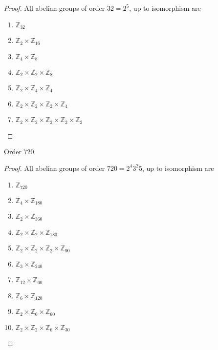 \begin{proof}
    All abelian groups of order $32 = 2^{5}$, up to isomorphism are
    \begin{enumerate}
        \item $\mathbb{Z}_{32}$
        \item $\mathbb{Z}_{2} \times \mathbb{Z}_{16}$
        \item $\mathbb{Z}_{4} \times \mathbb{Z}_{8}$
        \item $\mathbb{Z}_{2} \times \mathbb{Z}_{2} \times \mathbb{Z}_{8}$
        \item $\mathbb{Z}_{2} \times \mathbb{Z}_{4} \times \mathbb{Z}_{4}$
        \item $\mathbb{Z}_{2} \times \mathbb{Z}_{2} \times \mathbb{Z}_{2} \times \mathbb{Z}_{4}$
        \item $\mathbb{Z}_{2} \times \mathbb{Z}_{2} \times \mathbb{Z}_{2} \times \mathbb{Z}_{2} \times \mathbb{Z}_{2}$
    \end{enumerate}
\end{proof}

\begin{exercise}
    Order 720
\end{exercise}

\begin{proof}
    All abelian groups of order $720 = 2^{4}3^{2}5$, up to isomorphism are
    \begin{enumerate}
        \item $\mathbb{Z}_{720}$
        \item $\mathbb{Z}_{4} \times \mathbb{Z}_{180}$
        \item $\mathbb{Z}_{2} \times \mathbb{Z}_{360}$
        \item $\mathbb{Z}_{2} \times \mathbb{Z}_{2} \times \mathbb{Z}_{180}$
        \item $\mathbb{Z}_{2} \times \mathbb{Z}_{2} \times \mathbb{Z}_{2} \times \mathbb{Z}_{90}$
        \item $\mathbb{Z}_{3} \times \mathbb{Z}_{240}$
        \item $\mathbb{Z}_{12} \times \mathbb{Z}_{60}$
        \item $\mathbb{Z}_{6} \times \mathbb{Z}_{120}$
        \item $\mathbb{Z}_{2} \times \mathbb{Z}_{6} \times \mathbb{Z}_{60}$
        \item $\mathbb{Z}_{2} \times \mathbb{Z}_{2} \times \mathbb{Z}_{6} \times \mathbb{Z}_{30}$
    \end{enumerate}
\end{proof}

